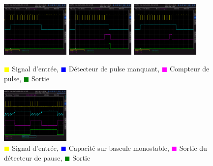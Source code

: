 \documentclass[french]{layout/Report}
\begin{document}
\begin{figure}[h]
\hspace{5mm}
\includegraphics[width=0.3\textwidth]{../measurements/SCR06}
\includegraphics[width=0.3\textwidth]{../measurements/SCR07}
\includegraphics[width=0.3\textwidth]{../measurements/SCR08}
\caption{
\textcolor{yellow}{$\blacksquare$} Signal d'entrée,
\textcolor{blue}{$\blacksquare$} Détecteur de pulse manquant,
\textcolor{magenta}{$\blacksquare$} Compteur de pulse,
\textcolor{green}{$\blacksquare$} Sortie
}
\label{fig:decoder_signal}
\end{figure}

\begin{figure}[h]
\hspace{5mm}
\includegraphics[width=0.3\textwidth]{../measurements/SCR12}
\caption{
\textcolor{yellow}{$\blacksquare$} Signal d'entrée,
\textcolor{blue}{$\blacksquare$} Capacité sur bascule monostable,
\textcolor{magenta}{$\blacksquare$} Sortie du détecteur de pause,
\textcolor{green}{$\blacksquare$} Sortie
}
\label{fig:output_signal}
\end{figure}
\end{document}
